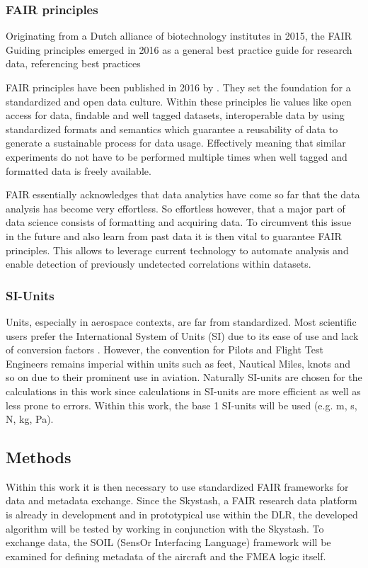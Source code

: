 \subsubsection{FAIR principles}

Originating from a Dutch alliance of biotechnology institutes in 2015, the FAIR Guiding principles emerged in 2016 as a general best practice guide for research data, referencing best practices

FAIR principles have been published in 2016 by \textcite{wilkinson_fair_2016}. They set the foundation for a standardized and open data culture. Within these principles lie values like open access for data, findable and well tagged datasets, interoperable data by using standardized formats and semantics which guarantee a reusability of data to generate a sustainable process for data usage. Effectively meaning that similar experiments do not have to be performed multiple times when well tagged and formatted data is freely available.


FAIR essentially acknowledges that data analytics have come so far that the data analysis has become very effortless. So effortless however, that a major part of data science consists of formatting and acquiring data. To circumvent this issue in the future and also learn from past data it is then vital to guarantee FAIR principles. This allows to leverage current technology to automate analysis and enable detection of previously undetected correlations within datasets.

\subsubsection{SI-Units}
Units, especially in aerospace contexts, are far from standardized. Most scientific users prefer the International System of Units (SI) due to its ease of use and lack of conversion factors \cite{newell_international_2019}. However, the convention for Pilots and Flight Test Engineers remains imperial within units such as feet, Nautical Miles, knots and so on due to their prominent use in aviation. Naturally SI-units are chosen for the calculations in this work since calculations in SI-units are more efficient as well as less prone to errors. Within this work, the base 1 SI-units will be used (e.g. m, s, N, kg, Pa).

\subsection{Methods}
Within this work it is then necessary to use standardized FAIR frameworks for data and metadata exchange. Since the Skystash, a FAIR research data platform is already in development and in prototypical use within the DLR, the developed algorithm will be tested by working in conjunction with the Skystash. To exchange data, the SOIL (SensOr Interfacing Language) framework will be examined for defining metadata of the aircraft and the FMEA logic itself.


